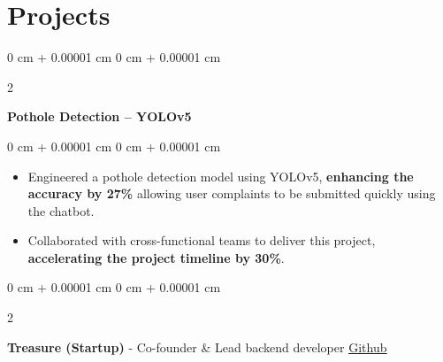\documentclass[10pt, a4paper]{article}
\newenvironment{highlights}{
    \begin{itemize}[
        topsep=0 cm,
        parsep=0 cm,
        partopsep=0pt,
        itemsep=0pt,
        leftmargin=0 cm + 10pt
    ]
}{
    \end{itemize}
} %
\newenvironment{onecolentry}{
    \begin{adjustwidth}{
        0 cm + 0.00001 cm
    }{
        0 cm + 0.00001 cm
    }
}{
    \end{adjustwidth}
} %
\newenvironment{twocolentry}[2][]{
    \onecolentry
    \def\secondColumn{#2}
    \setcolumnwidth{\fill, 6.0 cm}
    \begin{paracol}{2}
}{
    \switchcolumn \raggedleft \secondColumn
    \end{paracol}
    \endonecolentry
} %
\begin{document}
    \section{Projects}
        


        \begin{twocolentry}{}
            \textbf{Pothole Detection – YOLOv5}\end{twocolentry}

        \vspace{0.10 cm}
        \begin{onecolentry}
            \begin{highlights}
                \item Engineered a pothole detection model using YOLOv5, \textbf{enhancing the accuracy by 27\%} allowing user complaints to be submitted quickly using the chatbot.
                \item Collaborated with cross-functional teams to deliver this project, \textbf{accelerating the project timeline by 30\%}.
            \end{highlights}
        \end{onecolentry}
        
        \vspace{0.10 cm}

        \begin{twocolentry}{
            \href{https://github.com/ammrit2312/treasure-server}{\underline{Github}}
        }
            \textbf{Treasure (Startup)} - Co-founder \& Lead backend developer\end{twocolentry}
\end{document}
